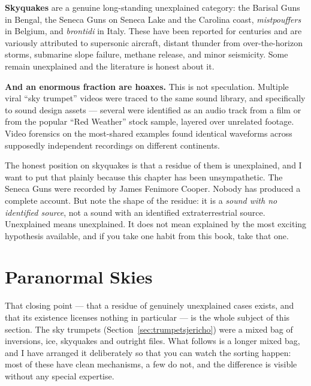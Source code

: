 \textbf{Skyquakes} are a genuine long-standing unexplained category: the Barisal Guns in Bengal,
the Seneca Guns on Seneca Lake and the Carolina coast, \emph{mistpouffers} in Belgium, and
\emph{brontidi} in Italy. These have been reported for centuries and are variously attributed to
supersonic aircraft, distant thunder from over-the-horizon storms, submarine slope failure,
methane release, and minor seismicity. Some remain unexplained and the literature is honest about
it.

\textbf{And an enormous fraction are hoaxes.} This is not speculation. Multiple viral ``sky
trumpet'' videos were traced to the same sound library, and specifically to sound design assets
--- several were identified as an audio track from a film or from the popular ``Red Weather''
stock sample, layered over unrelated footage. Video forensics on the most-shared examples found
identical waveforms across supposedly independent recordings on different continents. 

\begin{funfact}
The honest position on skyquakes is that a residue of them is unexplained, and I want to put that
plainly because this chapter has been unsympathetic. The Seneca Guns were recorded by James
Fenimore Cooper. Nobody has produced a complete account. But note the shape of the residue:
it is a \emph{sound with no identified source}, not a sound with an identified extraterrestrial
source. Unexplained means unexplained. It does not mean explained by the most exciting hypothesis
available, and if you take one habit from this book, take that one.
\end{funfact}

\section{Paranormal Skies}\label{sec:paranormalskies}

That closing point --- that a residue of genuinely unexplained cases exists, and that its existence
licenses nothing in particular --- is the whole subject of this section. The sky trumpets
(Section~\ref{sec:trumpetsjericho}) were a mixed bag of inversions, ice, skyquakes and outright
files. What follows is a longer mixed bag, and I have arranged it deliberately so that you can
watch the sorting happen: most of these have clean mechanisms, a few do not, and the difference is
visible without any special expertise.

